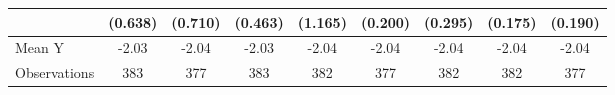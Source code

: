 {\begin{tabular}{l*{8}{c}}
            &     (0.638)         &     (0.710)         &     (0.463)         &     (1.165)         &     (0.200)         &     (0.295)         &     (0.175)         &     (0.190)         \\
\midrule
Mean Y      &       -2.03         &       -2.04         &       -2.03         &       -2.04         &       -2.04         &       -2.04         &       -2.04         &       -2.04         \\
Observations&         383         &         377         &         383         &         382         &         377         &         382         &         382         &         377         \\
\bottomrule
\end{tabular}
}
